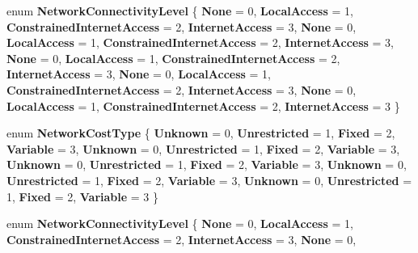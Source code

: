 \begin{DoxyCompactItemize}
enum {\bfseries Network\+Connectivity\+Level} \{ \newline
{\bfseries None} = 0, 
{\bfseries Local\+Access} = 1, 
{\bfseries Constrained\+Internet\+Access} = 2, 
{\bfseries Internet\+Access} = 3, 
\newline
{\bfseries None} = 0, 
{\bfseries Local\+Access} = 1, 
{\bfseries Constrained\+Internet\+Access} = 2, 
{\bfseries Internet\+Access} = 3, 
\newline
{\bfseries None} = 0, 
{\bfseries Local\+Access} = 1, 
{\bfseries Constrained\+Internet\+Access} = 2, 
{\bfseries Internet\+Access} = 3, 
\newline
{\bfseries None} = 0, 
{\bfseries Local\+Access} = 1, 
{\bfseries Constrained\+Internet\+Access} = 2, 
{\bfseries Internet\+Access} = 3, 
\newline
{\bfseries None} = 0, 
{\bfseries Local\+Access} = 1, 
{\bfseries Constrained\+Internet\+Access} = 2, 
{\bfseries Internet\+Access} = 3
 \}
\item 
\mbox{\label{namespace_windows_1_1_networking_1_1_connectivity_a1588bce4ba10673fae3a14c52de8ceb8}} 
enum {\bfseries Network\+Cost\+Type} \{ \newline
{\bfseries Unknown} = 0, 
{\bfseries Unrestricted} = 1, 
{\bfseries Fixed} = 2, 
{\bfseries Variable} = 3, 
\newline
{\bfseries Unknown} = 0, 
{\bfseries Unrestricted} = 1, 
{\bfseries Fixed} = 2, 
{\bfseries Variable} = 3, 
\newline
{\bfseries Unknown} = 0, 
{\bfseries Unrestricted} = 1, 
{\bfseries Fixed} = 2, 
{\bfseries Variable} = 3, 
\newline
{\bfseries Unknown} = 0, 
{\bfseries Unrestricted} = 1, 
{\bfseries Fixed} = 2, 
{\bfseries Variable} = 3, 
\newline
{\bfseries Unknown} = 0, 
{\bfseries Unrestricted} = 1, 
{\bfseries Fixed} = 2, 
{\bfseries Variable} = 3
 \}
\item 
\mbox{\label{namespace_windows_1_1_networking_1_1_connectivity_a2c33b149aa0f99f8a20a09851e23f36a}} 
enum {\bfseries Network\+Connectivity\+Level} \{ \newline
{\bfseries None} = 0, 
{\bfseries Local\+Access} = 1, 
{\bfseries Constrained\+Internet\+Access} = 2, 
{\bfseries Internet\+Access} = 3, 
\newline
{\bfseries None} = 0, 

\end{DoxyCompactItemize}
